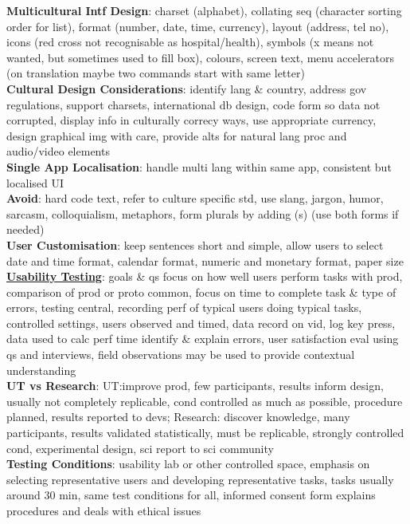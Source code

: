 \documentclass[a4paper]{article}
\begin{document}
\begin{multicols}{3}
        \textbf{Multicultural Intf Design}: charset (alphabet), collating seq (character sorting order for list), format (number, date, time, currency), layout (address, tel no), icons (red cross not recognisable as hospital/health), symbols (x means not wanted, but sometimes used to fill box), colours, screen text, menu accelerators (on translation maybe two commands start with same letter)\\
        \textbf{Cultural Design Considerations}: identify lang \& country, address gov regulations, support charsets, international db design, code form so data not corrupted, display info in culturally correcy ways, use appropriate currency, design graphical img with care, provide alts for natural lang proc and audio/video elements\\
        \textbf{Single App Localisation}: handle multi lang within same app, consistent but localised UI\\
        \textbf{Avoid}: hard code text, refer to culture specific std, use slang, jargon, humor, sarcasm, colloquialism, metaphors, form plurals by adding (s) (use both forms if needed)\\
        \textbf{User Customisation}: keep sentences short and simple, allow users to select date and time format, calendar format, numeric and monetary format, paper size\\
        \underline{\textbf{Usability Testing}}: goals \& qs focus on how well users perform tasks with prod, comparison of prod or proto common, focus on time to complete task \& type of errors, testing central, recording perf of typical users doing typical tasks, controlled settings, users observed and timed, data record on vid, log key press, data used to calc perf time identify \& explain errors, user satisfaction eval using qs and interviews, field observations may be used to provide contextual understanding\\
        \textbf{UT vs Research}: UT:\@ improve prod, few participants, results inform design, usually not completely replicable, cond controlled as much as possible, procedure planned, results reported to devs; Research: discover knowledge, many participants, results validated statistically, must be replicable, strongly controlled cond, experimental design, sci report to sci community\\
        \textbf{Testing Conditions}: usability lab or other controlled space, emphasis on selecting representative users and developing representative tasks, tasks usually around 30 min, same test conditions for all, informed consent form explains procedures and deals with ethical issues\\

\end{multicols}
\end{document}
